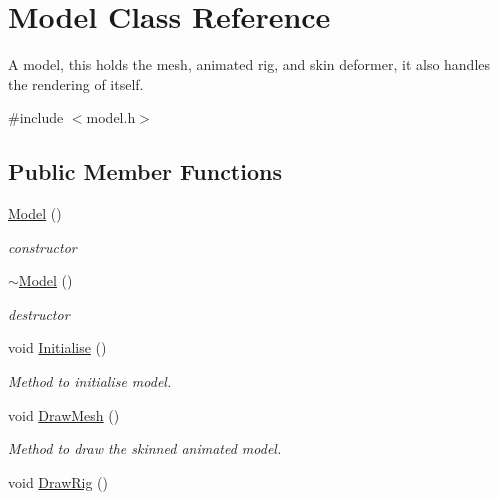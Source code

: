 \hypertarget{classModel}{}\section{Model Class Reference}
\label{classModel}


A model, this holds the mesh, animated rig, and skin deformer, it also handles the rendering of itself.  




{\ttfamily \#include $<$model.\+h$>$}

\subsection*{Public Member Functions}
\begin{DoxyCompactItemize}
\item 
\hyperlink{classModel_ae3b375de5f6df4faf74a95d64748e048}{Model} ()\hypertarget{classModel_ae3b375de5f6df4faf74a95d64748e048}{}\label{classModel_ae3b375de5f6df4faf74a95d64748e048}

\begin{DoxyCompactList}\small\item\em constructor \end{DoxyCompactList}\item 
\hyperlink{classModel_ad6ebd2062a0b823db841a0b88baac4c0}{$\sim$\+Model} ()\hypertarget{classModel_ad6ebd2062a0b823db841a0b88baac4c0}{}\label{classModel_ad6ebd2062a0b823db841a0b88baac4c0}

\begin{DoxyCompactList}\small\item\em destructor \end{DoxyCompactList}\item 
void \hyperlink{classModel_a9fc27c23ef71e81fc9949953125fcee8}{Initialise} ()\hypertarget{classModel_a9fc27c23ef71e81fc9949953125fcee8}{}\label{classModel_a9fc27c23ef71e81fc9949953125fcee8}

\begin{DoxyCompactList}\small\item\em Method to initialise model. \end{DoxyCompactList}\item 
void \hyperlink{classModel_ac02a26d23143d6456a726957e1042840}{Draw\+Mesh} ()\hypertarget{classModel_ac02a26d23143d6456a726957e1042840}{}\label{classModel_ac02a26d23143d6456a726957e1042840}

\begin{DoxyCompactList}\small\item\em Method to draw the skinned animated model. \end{DoxyCompactList}\item 
void \hyperlink{classModel_a593d18e249b56ca87fdc6339916e7b5e}{Draw\+Rig} ()\hypertarget{classModel_a593d18e249b56ca87fdc6339916e7b5e}{}\label{classModel_a593d18e249b56ca87fdc6339916e7b5e}


\end{DoxyCompactItemize}
